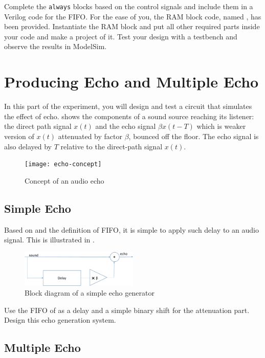 \documentclass[12pt, logo=tehranDLDL/ut]{tehranDLDL}
\begin{document}
Complete the \lstinline{always} blocks based on the control signals and include them in a Verilog code for the FIFO.
For the ease of you, the RAM block code, named , has been provided. Instantiate the RAM block and put all other required parts inside your code and make a project of it.
Test your design with a testbench and observe the results in ModelSim.

\designverification{}

\section{Producing Echo and Multiple Echo}

In this part of the experiment, you will design and test a circuit that simulates the effect of echo.
 shows the components of a sound source reaching its listener:
the direct path signal $x(t)$ and
the echo signal $\beta x(t-T)$ which is weaker version of $x(t)$ attenuated by factor $\beta$, bounced off the floor. The echo signal is also delayed by $T$ relative to the direct-path signal $x(t)$.

\begin{figure}[b]
    \centering
    \caption{Concept of an audio echo\label{fig:echo-concept}}
    \texttt{[image: echo-concept]}
\end{figure}

\subsection{Simple Echo}

Based on  and the definition of FIFO, it is simple to apply such delay to an audio signal. This is illustrated in .

\begin{figure}
    \centering
    \caption{Block diagram of a simple echo generator\label{fig:simple-echo}}
    \includegraphics[width=0.5\textwidth]{simple-echo}
\end{figure}

Use the FIFO of  as a delay and a simple binary shift for the attenuation part. Design this echo generation system. 

\subsection{Multiple Echo}
\end{document}
